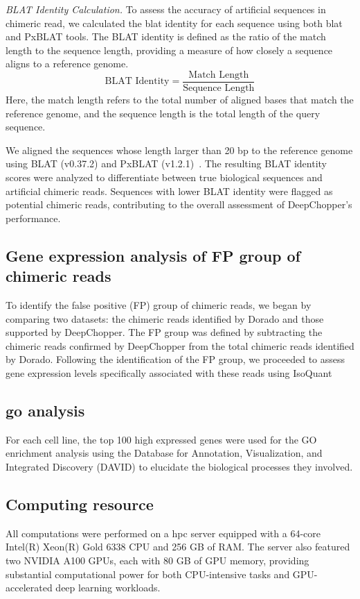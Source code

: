 \documentclass[pdflatex, sn-mathphys-num, lineno]{sn-jnl}%
\theoremstyle{thmstyleone}%
\theoremstyle{thmstyletwo}%
\theoremstyle{thmstylethree}%
\begin{document}
\textit{BLAT Identity Calculation.} To assess the accuracy of artificial sequences in chimeric read, we calculated the \gls{blat} identity for each sequence using both \gls{blat} and PxBLAT tools.
The BLAT identity is defined as the ratio of the match length to the sequence length, providing a measure of how closely a sequence aligns to a reference genome.
\[
\textrm{BLAT Identity} = \frac{\textrm{Match Length}}{\textrm{Sequence Length}}
\]
Here, the match length refers to the total number of aligned bases that match the reference genome, and the sequence length is the total length of the query sequence.

We aligned the sequences whose length larger than 20 bp to the reference genome using BLAT (v0.37.2) and PxBLAT (v1.2.1)~\cite{kent2002blat, li2024pxblat}.
The resulting BLAT identity scores were analyzed to differentiate between true biological sequences and artificial chimeric reads.
Sequences with lower BLAT identity were flagged as potential chimeric reads, contributing to the overall assessment of DeepChopper's performance.


\subsection{Gene expression analysis of FP group of chimeric reads}
To identify the false positive (FP) group of chimeric reads, we began by comparing two datasets: the chimeric reads identified by Dorado and those supported by DeepChopper. The FP group was defined by subtracting the chimeric reads confirmed by DeepChopper from the total chimeric reads identified by Dorado. Following the identification of the FP group, we proceeded to assess gene expression levels specifically associated with these reads using IsoQuant\cite{IsoQuant}


\subsection{\gls{go} analysis}
For each cell line, the top 100 high expressed genes were used for the GO enrichment analysis using the Database for Annotation, Visualization, and Integrated Discovery (DAVID)\cite{david} to elucidate the biological processes they involved.

\subsection{Computing resource}

All computations were performed on a \gls{hpc} server equipped with a 64-core Intel(R) Xeon(R) Gold 6338 CPU and 256 GB of RAM.
The server also featured two NVIDIA A100 GPUs, each with 80 GB of GPU memory, providing substantial computational power for both CPU-intensive tasks and GPU-accelerated deep learning workloads.
\end{document}
